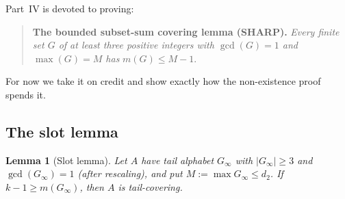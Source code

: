 \documentclass[11pt,reqno]{amsart}
\theoremstyle{plain}
\newtheorem{lemma}[theorem]{Lemma}
\theoremstyle{definition}
\theoremstyle{remark}
\newcommand{\Ginf}{G_\infty}
\begin{document}
Part~IV is devoted to proving:

\begin{quote}
\textbf{The bounded subset-sum covering lemma (SHARP).} \emph{Every finite set $G$
of at least three positive integers with $\gcd(G) = 1$ and $\max(G) = M$ has}
$m(G) \le M - 1$.
\end{quote}

For now we take it on credit and show exactly how the non-existence proof spends
it.

\subsection{The slot lemma}

\begin{lemma}[Slot lemma]\label{lem:slot-friendly}
Let $A$ have tail alphabet $\Ginf$ with $|\Ginf| \ge 3$ and $\gcd(\Ginf) = 1$
(after rescaling), and put $M := \max \Ginf \le d_2$. If $k - 1 \ge m(\Ginf)$, then
$A$ is tail-covering.
\end{lemma}
\end{document}
